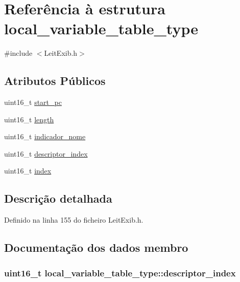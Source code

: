 \hypertarget{structlocal__variable__table__type}{\section{Referência à estrutura local\-\_\-variable\-\_\-table\-\_\-type}
\label{structlocal__variable__table__type}
}


{\ttfamily \#include $<$Leit\-Exib.\-h$>$}

\subsection*{Atributos Públicos}
\begin{DoxyCompactItemize}
\item 
uint16\-\_\-t \hyperlink{structlocal__variable__table__type_a560d45b628c0adaf0f1716b001d49379}{start\-\_\-pc}
\item 
uint16\-\_\-t \hyperlink{structlocal__variable__table__type_a0dc62ed5079cc1226d9c254287009198}{length}
\item 
uint16\-\_\-t \hyperlink{structlocal__variable__table__type_a2e30d42da683da1dfc3a45e07dde62ec}{indicador\-\_\-nome}
\item 
uint16\-\_\-t \hyperlink{structlocal__variable__table__type_a3c1df7fc91bfab07bce2ab1e19084fe8}{descriptor\-\_\-index}
\item 
uint16\-\_\-t \hyperlink{structlocal__variable__table__type_a99e8d85f07bd570440689f229e4e0fa1}{index}
\end{DoxyCompactItemize}


\subsection{Descrição detalhada}


Definido na linha 155 do ficheiro Leit\-Exib.\-h.



\subsection{Documentação dos dados membro}
\hypertarget{structlocal__variable__table__type_a3c1df7fc91bfab07bce2ab1e19084fe8}{
\subsubsection[{descriptor\-\_\-index}]{\setlength{\rightskip}{0pt plus 5cm}uint16\-\_\-t local\-\_\-variable\-\_\-table\-\_\-type\-::descriptor\-\_\-index}}\label{structlocal__variable__table__type_a3c1df7fc91bfab07bce2ab1e19084fe8}


